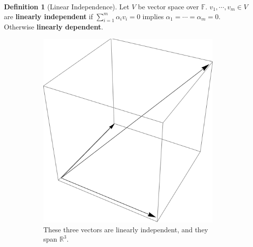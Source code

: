 \documentclass[12pt, a4paper]{article}
\newcommand{\R}{\mathbb{R}}
\theoremstyle{remark}
\theoremstyle{definition}
\newtheorem{definition}{Definition}
\numberwithin{equation}{section}
\numberwithin{definition}{section}
\numberwithin{example}{section}
\numberwithin{exercise}{section}
\numberwithin{remark}{section}
\numberwithin{figure}{section}
\begin{document}
\begin{definition}[Linear Independence]
    Let $V$ be vector space over $\mathbb{F}$.
    $v_1, \cdots, v_m \in V$ are \textbf{linearly independent} if
    $\sum_{i=1}^m \alpha_i v_i = 0$ implies $\alpha_1=\cdots=\alpha_m = 0$.
    Otherwise \textbf{linearly dependent}.
    \begin{figure}[tbp]
        \centering
        \begin{subfigure}[b]{0.45\textwidth}
            \centering
            \includegraphics[width=\textwidth]{LinearIndependence}
            \caption{These three vectors are linearly independent, and they span $\R^3$.}
        \end{subfigure}
        \hfill
        \begin{subfigure}[b]{0.45\textwidth}
            \centering

\end{subfigure}
\end{figure}
\end{definition}
\end{document}

